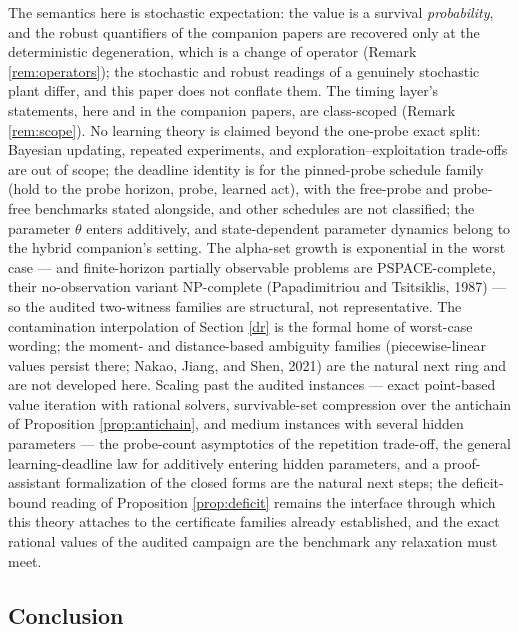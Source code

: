 \documentclass[10pt,twocolumn]{article}
\theoremstyle{plain}
\theoremstyle{definition}
\theoremstyle{remark}
\begin{document}
The semantics here is stochastic expectation: the value is a survival
\emph{probability}, and the robust quantifiers of the companion papers
are recovered only at the deterministic degeneration, which is a change
of operator (Remark \ref{rem:operators}); the stochastic and robust
readings of a genuinely stochastic plant differ, and this paper does not
conflate them. The timing layer's statements, here and in the companion
papers, are class-scoped (Remark \ref{rem:scope}). No learning theory is
claimed beyond the one-probe exact split: Bayesian updating, repeated
experiments, and exploration--exploitation trade-offs are out of scope;
the deadline identity is for the pinned-probe schedule family (hold to
the probe horizon, probe, learned act), with the free-probe and
probe-free benchmarks stated alongside, and other schedules are not
classified; the parameter
\(\theta\) enters additively, and state-dependent parameter dynamics
belong to the hybrid companion's setting. The alpha-set growth is
exponential in the worst case --- and finite-horizon partially
observable problems are PSPACE-complete, their no-observation variant
NP-complete (Papadimitriou and Tsitsiklis, 1987) --- so the audited
two-witness families are structural, not representative. The contamination interpolation of Section \ref{dr} is the formal home
of worst-case wording; the moment- and distance-based ambiguity families
(piecewise-linear values persist there; Nakao, Jiang, and Shen, 2021)
are the natural next ring and are not developed here.
Scaling past the audited instances --- exact point-based value iteration
with rational solvers, survivable-set compression over the antichain of
Proposition \ref{prop:antichain}, and medium instances with several
hidden parameters --- the probe-count asymptotics of the repetition
trade-off, the general learning-deadline law for additively entering
hidden parameters, and a proof-assistant formalization of the closed
forms are the natural next steps; the deficit-bound reading of
Proposition \ref{prop:deficit} remains the interface through which this
theory attaches to the certificate families already established, and the
exact rational values of the audited campaign are the benchmark any
relaxation must meet.

\subsection{Conclusion}\label{conclusion}
\end{document}
